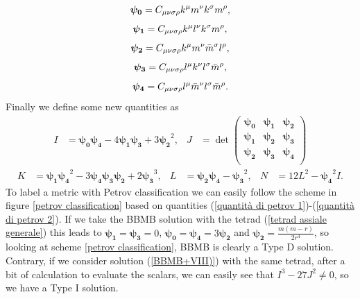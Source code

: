 \begin{equation}
    \boldsymbol{\psi_0} = C_{\mu \nu \sigma \rho}k^{\mu}m^{\nu}k^{\sigma}m^{\rho},
    \notag
\end{equation}
\begin{equation}
    \boldsymbol{\psi_1} = C_{\mu \nu \sigma \rho}k^{\mu}l^{\nu}k^{\sigma}m^{\rho},
    \notag
\end{equation}
\begin{equation}
    \boldsymbol{\psi_2} = C_{\mu \nu \sigma \rho}k^{\mu}m^{\nu}\Bar{m}^{\sigma}l^{\rho},
    \label{psies classificaione petrov}
\end{equation}
\begin{equation}
    \boldsymbol{\psi_3} = C_{\mu \nu \sigma \rho}l^{\mu}k^{\nu}l^{\sigma}\Bar{m}^{\rho},
    \notag
\end{equation}
\begin{equation}
    \boldsymbol{\psi_4} = C_{\mu \nu \sigma \rho}l^{\mu}\Bar{m}^{\nu}l^{\sigma}\Bar{m}^{\rho}.
    \notag
\end{equation}
Finally we define some new quantities as 
\begin{align}
    I & = \boldsymbol{\psi_0}\boldsymbol{\psi_4}-4\boldsymbol{\psi_1}\boldsymbol{\psi_3}+3\boldsymbol{\psi_2}^2 , & J &= \det \left(\begin{matrix}
    \boldsymbol{\psi_0} & \boldsymbol{\psi_1} & \boldsymbol{\psi_2} \\
    \boldsymbol{\psi_1} & \boldsymbol{\psi_2} & \boldsymbol{\psi_3} \\
    \boldsymbol{\psi_2} & \boldsymbol{\psi_3} & \boldsymbol{\psi_4} \\
\end{matrix} \right) 
\label{quantità di petrov 1}
\end{align}
\begin{align}
  K & = \boldsymbol{\psi_1}\boldsymbol{\psi_4}^2-3\boldsymbol{\psi_4}\boldsymbol{\psi_3}\boldsymbol{\psi_2} +2\boldsymbol{\psi_3}^3 ,& L &= \boldsymbol{\psi_2}\boldsymbol{\psi_4}-\boldsymbol{\psi_3}^2 ,&
  N& = 12L^2-\boldsymbol{\psi_4}^2I.
  \label{quantità di petrov 2}
\end{align}
To label a metric with Petrov classification we can easily follow the scheme in figure \ref{petrov classification} based on quantities (\ref{quantità di petrov 1})-(\ref{quantità di petrov 2}).
If we take the BBMB solution with the tetrad (\ref{tetrad assiale generale}) this leads to $\boldsymbol{\psi_1}=\boldsymbol{\psi_3}=0$, $\boldsymbol{\psi_0}=\boldsymbol{\psi_4}=3\boldsymbol{\psi_2}$ and $\boldsymbol{\psi_2}=\frac{m(m-r)}{2r^4}$, so looking at scheme \ref{petrov classification}, BBMB is clearly a Type D solution. Contrary, if we consider solution (\ref{BBMB+VIII)}) with the same tetrad, after a bit of calculation to evaluate the scalars, we can easily see that $I^3-27J^2\neq 0$, so we have a Type I solution.


